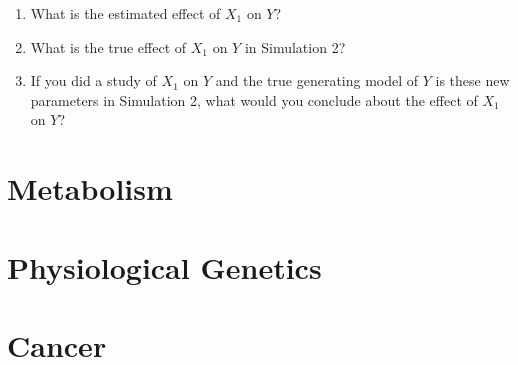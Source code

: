 \documentclass[]{book}
\providecommand{\tightlist}{%
  \setlength{\itemsep}{0pt}\setlength{\parskip}{0pt}}
\begin{document}
\begin{enumerate}
\def\labelenumi{\arabic{enumi}.}
\setcounter{enumi}{7}
\tightlist
\item
  What is the estimated effect of \(X_1\) on \(Y\)?
\item
  What is the true effect of \(X_1\) on \(Y\) in Simulation 2?
\item
  If you did a study of \(X_1\) on \(Y\) and the true generating model
  of \(Y\) is these new parameters in Simulation 2, what would you
  conclude about the effect of \(X_1\) on \(Y\)?
\end{enumerate}

\chapter{Metabolism}\label{metabolism}

\chapter{Physiological Genetics}\label{physiological-genetics}

\chapter{Cancer}\label{cancer}


\end{document}
